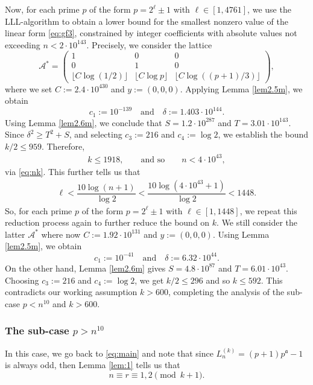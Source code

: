 \documentclass[11pt,a4paper]{article}
\numberwithin{equation}{section}
\numberwithin{table}{section}
\numberwithin{figure}{section}
\begin{document}
\begin{enumerate}[(a)]
	Now, for each prime $p$ of the form $p=2^\ell \pm 1$ with $\ell \in [1,4761]$, we use the LLL-algorithm to obtain a lower bound for the smallest nonzero value of the linear form \eqref{eq:gf3}, constrained by integer coefficients with absolute values not exceeding $n < 2 \cdot 10^{143}$. Precisely, we consider the lattice  
\[
\mathcal{A^*} = \begin{pmatrix} 
	1 & 0 & 0 \\ 
	0 & 1 & 0 \\ 
	\lfloor C\log (1/2)\rfloor & \lfloor C\log p\rfloor & \lfloor C\log \left((p+1)/3\right) \rfloor
\end{pmatrix},
\]
where we set $C := 2.4\cdot 10^{430}$ and $y := (0,0,0)$. Applying Lemma \ref{lem2.5m}, we obtain 
\[
c_1 := 10^{-139} \quad \text{and} \quad \delta := 1.403\cdot 10^{144}. 
\]
Using Lemma \ref{lem2.6m}, we conclude that $S =1.2 \cdot 10^{287}$ and $T = 3.01 \cdot 10^{143}$. Since $\delta^2 \geq T^2 + S$, and selecting $c_3 := 216$ and $c_4 := \log 2$, we establish the bound $k/2 \leq 959$. Therefore, 
\begin{align*}
k\le 1918, \qquad \text{and so} \qquad n < 4 \cdot 10^{43},	
\end{align*}
 via \eqref{eq:nk}. This further tells us that
 \begin{align*}
 	\ell < \dfrac{10\log (n+1)}{\log 2} < \dfrac{10\log (4\cdot 10^{43}+1)}{\log 2} <1448.
 \end{align*}
So, for each prime $p$ of the form $p=2^\ell \pm 1$ with $\ell \in [1,1448]$, we repeat this reduction process again to further reduce the bound on $k$. We still consider the latter $\mathcal{A^*}$ where now $C := 1.92\cdot 10^{131}$ and $y := (0,0,0)$. Using Lemma \ref{lem2.5m}, we obtain 
\[
c_1 := 10^{-41} \quad \text{and} \quad \delta := 6.32\cdot 10^{44}. 
\]
On the other hand, Lemma \ref{lem2.6m} gives $S =4.8 \cdot 10^{87}$ and $T = 6.01 \cdot 10^{43}$. Choosing $c_3 := 216$ and $c_4 := \log 2$, we get $k/2 \leq 296$ and so $k \le 592$. This contradicts our working assumption $k > 600$, completing the analysis of the sub-case $p < n^{10}$ and $k > 600$.
\end{enumerate}


\subsubsection{The sub-case $p > n^{10}$}

In this case, we go back to \eqref{eq:main} and note that since $L_n^{(k)} = (p+1)p^\mathfrak{a}-1$ is always odd, then Lemma \ref{lem:1} tells us that 
$$n\equiv r \equiv 1,2 \pmod {k+1}.$$
\end{document}
